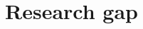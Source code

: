 \documentclass{cshonours}
\begin{document}

\section{Research gap}
\label{subsec:research-gap}
\end{document}
